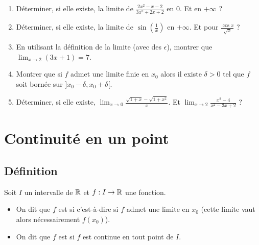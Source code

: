 \documentclass[class=report,crop=false]{standalone}
\begin{document}


\begin{miniexercices}
\sauteligne
\begin{enumerate}
  \item Déterminer, si elle existe, la limite de $\frac{2x^2-x-2}{3x^2+2x+2}$ en $0$.
  Et en $+\infty$ ?

  \item Déterminer, si elle existe, la limite de $\sin\left(\frac1x\right)$ en $+\infty$.
  Et pour $\frac{\cos x}{\sqrt{x}}$ ?

  \item En utilisant la définition de la limite (avec des $\epsilon$),
  montrer que $\lim_{x\to2} (3x+1) = 7$.

  \item Montrer que si $f$ admet une limite finie en $x_0$ alors il existe $\delta>0$ tel que
  $f$ soit bornée sur $]x_0-\delta,x_0+\delta[$.

  \item Déterminer, si elle existe,   $\lim_{x\to0} \frac{\sqrt{1+x}-\sqrt{1+x^2}}{x}$.
  Et $\lim_{x\to2} \frac{x^2-4}{x^2-3x+2}$ ?
\end{enumerate}
\end{miniexercices}



\section{Continuité en un point}
\subsection{Définition}

Soit $I$ un intervalle de $\mathbb{R}$ et $f:I\to\mathbb{R}$ une fonction.

\begin{definition}
\sauteligne
\begin{itemize}
  \item On dit que $f$ est  si
c'est-à-dire si $f$ admet une limite en $x_0$ (cette limite vaut alors nécessairement $f(x_0)$).

  \item On dit que $f$ est  si $f$ est continue en tout point de $I$.
\end{itemize}
\end{definition}
\end{document}
